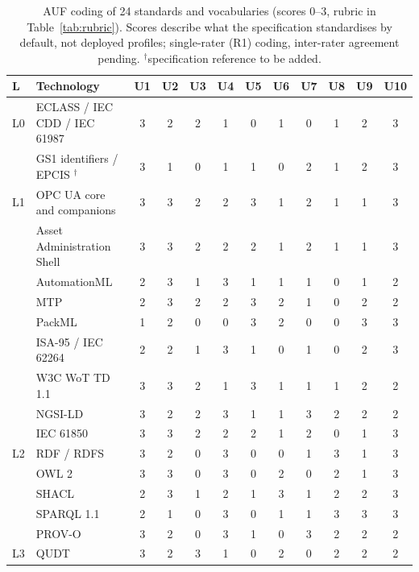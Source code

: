 \begin{table}[t]
\centering\footnotesize
\setlength{\tabcolsep}{3.4pt}
\caption{AUF coding of 24 standards and vocabularies (scores 0--3, rubric in Table~\ref{tab:rubric}). Scores describe what the specification standardises by default, not deployed profiles; single-rater (R1) coding, inter-rater agreement pending. $^\dagger$specification reference to be added.}
\label{tab:auf-matrix}
\begin{tabular}{@{}llcccccccccc@{}}
\toprule
L & Technology & U1 & U2 & U3 & U4 & U5 & U6 & U7 & U8 & U9 & U10 \\
\midrule
L0 & ECLASS / IEC CDD / IEC 61987 \cite{eclass,iec61360,iec61987,iso29002} & 3 & 2 & 2 & 1 & 0 & 1 & 0 & 1 & 2 & 3 \\
 & GS1 identifiers / EPCIS $^\dagger$ & 3 & 1 & 0 & 1 & 1 & 0 & 2 & 1 & 2 & 3 \\
\midrule
L1 & OPC UA core and companions \cite{iec62541} & 3 & 3 & 2 & 2 & 3 & 1 & 2 & 1 & 1 & 3 \\
 & Asset Administration Shell \cite{idta2023aas,idta2023nameplate} & 3 & 3 & 2 & 2 & 2 & 1 & 2 & 1 & 1 & 3 \\
 & AutomationML \cite{iec62714} & 2 & 3 & 1 & 3 & 1 & 1 & 1 & 0 & 1 & 2 \\
 & MTP \cite{vdi2658} & 2 & 3 & 2 & 2 & 3 & 2 & 1 & 0 & 2 & 2 \\
 & PackML \cite{isa88} & 1 & 2 & 0 & 0 & 3 & 2 & 0 & 0 & 3 & 3 \\
 & ISA-95 / IEC 62264 \cite{iec62264} & 2 & 2 & 1 & 3 & 1 & 0 & 1 & 0 & 2 & 3 \\
 & W3C WoT TD 1.1 \cite{w3c2023wot} & 3 & 3 & 2 & 1 & 3 & 1 & 1 & 1 & 2 & 2 \\
 & NGSI-LD \cite{etsi2023ngsild} & 3 & 2 & 2 & 3 & 1 & 1 & 3 & 2 & 2 & 2 \\
 & IEC 61850 \cite{iec61850} & 3 & 3 & 2 & 2 & 2 & 1 & 2 & 0 & 1 & 3 \\
\midrule
L2 & RDF / RDFS \cite{w3c2014rdf} & 3 & 2 & 0 & 3 & 0 & 0 & 1 & 3 & 1 & 3 \\
 & OWL 2 \cite{w3c2012owl} & 3 & 3 & 0 & 3 & 0 & 2 & 0 & 2 & 1 & 3 \\
 & SHACL \cite{knublauch2017shacl} & 2 & 3 & 1 & 2 & 1 & 3 & 1 & 2 & 2 & 3 \\
 & SPARQL 1.1 \cite{w3c2013sparql} & 2 & 1 & 0 & 3 & 0 & 1 & 1 & 3 & 3 & 3 \\
 & PROV-O \cite{w3c2013prov} & 3 & 2 & 0 & 3 & 1 & 0 & 3 & 2 & 2 & 2 \\
\midrule
L3 & QUDT \cite{qudt} & 3 & 2 & 3 & 1 & 0 & 2 & 0 & 2 & 2 & 2 \\

\end{tabular}
\end{table}
